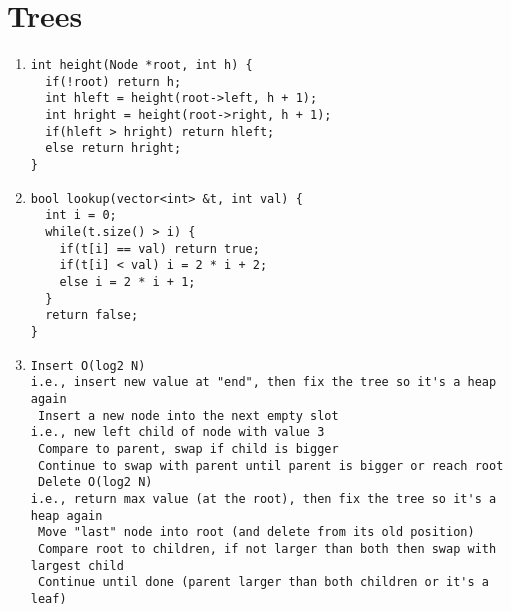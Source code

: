 \documentclass[12pt]{article}
\begin{document}
\section{Trees}
\begin{enumerate}
    \item \begin{verbatim}
int height(Node *root, int h) {
  if(!root) return h;
  int hleft = height(root->left, h + 1);
  int hright = height(root->right, h + 1);
  if(hleft > hright) return hleft;
  else return hright;
}
    \end{verbatim}
    \item \begin{verbatim}
bool lookup(vector<int> &t, int val) {
  int i = 0;
  while(t.size() > i) {
    if(t[i] == val) return true;
    if(t[i] < val) i = 2 * i + 2;
    else i = 2 * i + 1;
  }
  return false;
}
    \end{verbatim}
    \item \begin{verbatim}
Insert O(log2 N)
i.e., insert new value at "end", then fix the tree so it's a heap again
 Insert a new node into the next empty slot
i.e., new left child of node with value 3
 Compare to parent, swap if child is bigger
 Continue to swap with parent until parent is bigger or reach root
 Delete O(log2 N)
i.e., return max value (at the root), then fix the tree so it's a heap again
 Move "last" node into root (and delete from its old position)
 Compare root to children, if not larger than both then swap with
largest child
 Continue until done (parent larger than both children or it's a leaf)  
    \end{verbatim}
\end{enumerate}
\end{document}
